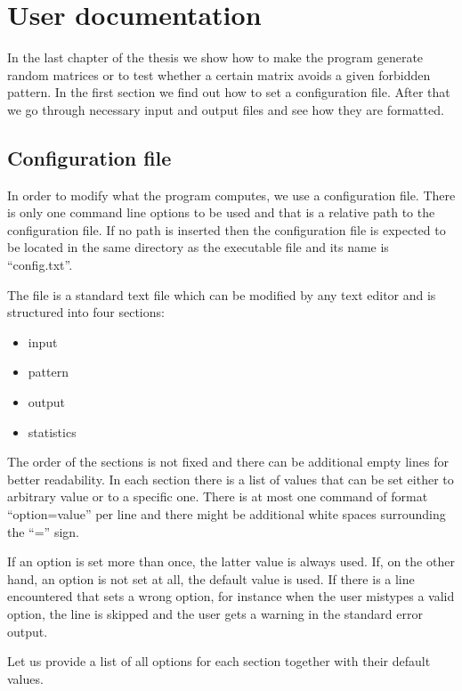 \chapter{User documentation}
\label{chap:udoc}
In the last chapter of the thesis we show how to make the program generate random matrices or to test whether a certain matrix avoids a given forbidden pattern. In the first section we find out how to set a configuration file. After that we go through necessary input and output files and see how they are formatted.

\section{Configuration file}

In order to modify what the program computes, we use a configuration file. There is only one command line options to be used and that is a relative path to the configuration file. If no path is inserted then the configuration file is expected to be located in the same directory as the executable file and its name is ``config.txt''.

The file is a standard text file which can be modified by any text editor and is structured into four sections:
\begin{itemize}
\item input
\item pattern
\item output
\item statistics
\end{itemize}
The order of the sections is not fixed and there can be additional empty lines for better readability. In each section there is a list of values that can be set either to arbitrary value or to a specific one. There is at most one command of format ``option=value'' per line and there might be additional white spaces surrounding the ``='' sign.

If an option is set more than once, the latter value is always used. If, on the other hand, an option is not set at all, the default value is used. If there is a line encountered that sets a wrong option, for instance when the user mistypes a valid option, the line is skipped and the user gets a warning in the standard error output.

Let us provide a list of all options for each section together with their default values.

